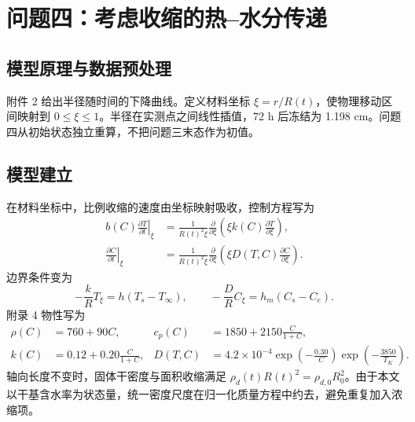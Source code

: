 \documentclass[withoutpreface,bwprint]{cumcmthesis}
\begin{document}
\section{问题四：考虑收缩的热--水分传递}
\subsection{模型原理与数据预处理}
附件 2 给出半径随时间的下降曲线。定义材料坐标 $\xi=r/R(t)$，使物理移动区间映射到 $0\le\xi\le1$。半径在实测点之间线性插值，72 h 后冻结为 1.198 cm。问题四从初始状态独立重算，不把问题三末态作为初值。
\subsection{模型建立}
在材料坐标中，比例收缩的速度由坐标映射吸收，控制方程写为
\begin{align} b(C)\left.\frac{\partial T}{\partial t}\right|_{\xi}&=\frac{1}{R(t)^2\xi}\frac{\partial}{\partial\xi}\left(\xi k(C)\frac{\partial T}{\partial\xi}\right),\\ \left.\frac{\partial C}{\partial t}\right|_{\xi}&=\frac{1}{R(t)^2\xi}\frac{\partial}{\partial\xi}\left(\xi D(T,C)\frac{\partial C}{\partial\xi}\right). \end{align}
边界条件变为
\begin{equation} -\frac{k}{R}T_\xi=h(T_s-T_\infty),\qquad -\frac{D}{R}C_\xi=h_m(C_s-C_e). \end{equation}
附录 4 物性写为
\begin{align} \rho(C)&=760+90C,& c_p(C)&=1850+2150\frac{C}{1+C},\\ k(C)&=0.12+0.20\frac{C}{1+C},&D(T,C)&=4.2\times10^{-4}\exp\left(-\frac{0.30}{C}\right)\exp\left(-\frac{3850}{T_K}\right). \end{align}
轴向长度不变时，固体干密度与面积收缩满足 $\rho_d(t)R(t)^2=\rho_{d,0}R_0^2$。由于本文以干基含水率为状态量，统一密度尺度在归一化质量方程中约去，避免重复加入浓缩项。
\end{document}
